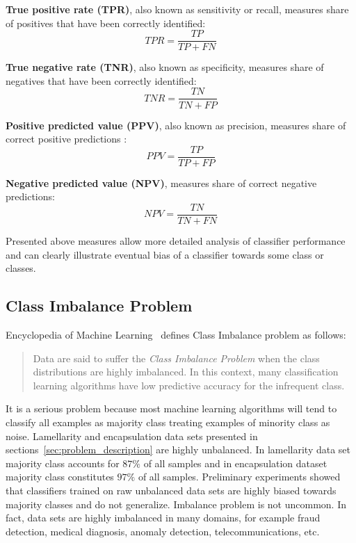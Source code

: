 \documentclass[a4paper, 11pt, table]{article}
\begin{document}
\textbf{True positive rate (TPR)}, also known as sensitivity or recall, measures share of positives that have been correctly identified:
\begin{equation*}
TPR = \frac{TP}{TP + FN}
\end{equation*}

\textbf{True negative rate (TNR)}, also known as specificity, measures share of negatives that have been correctly identified:
\begin{equation*}
TNR = \frac{TN}{TN + FP}
\end{equation*}

\textbf{Positive predicted value (PPV)}, also known as precision, measures share of correct positive predictions :
\begin{equation*}
PPV = \frac{TP}{TP + FP}
\end{equation*}

\textbf{Negative predicted value (NPV)}, measures share of correct negative predictions:
\begin{equation*}
NPV = \frac{TN}{TN + FN}
\end{equation*}

Presented above measures allow more detailed analysis of classifier performance and can clearly illustrate eventual bias of a classifier towards some class or classes. 

\subsection{Class Imbalance Problem}
\label{sec:class_imbalance}
Encyclopedia of Machine Learning~\cite{Ling2010} defines Class Imbalance problem as follows:
\blockquote{Data are said to suffer the \textit{Class Imbalance Problem} when the class distributions are highly imbalanced. In this context, many classification learning algorithms have low predictive accuracy for the infrequent class.}

It is a serious problem because most machine learning algorithms will tend to classify all examples as majority class treating examples of minority class as noise. Lamellarity and encapsulation data sets presented in sections~\ref{sec:problem_description} are highly unbalanced. In lamellarity data set majority class accounts for $87\%$ of all samples and in encapsulation dataset majority class constitutes $97\%$ of all samples. Preliminary experiments showed that classifiers trained on raw unbalanced data sets are highly biased towards majority classes and do not generalize. Imbalance problem is not uncommon. In fact, data sets are highly imbalanced in many domains, for example fraud detection, medical diagnosis, anomaly detection, telecommunications, etc. 
\end{document}
